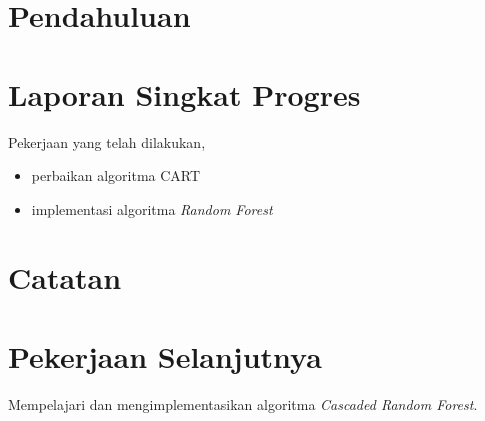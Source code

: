 






\section{Pendahuluan}



\section{Laporan Singkat Progres}

Pekerjaan yang telah dilakukan,
\begin{itemize}
\item perbaikan algoritma CART
\item implementasi algoritma \textit{Random Forest}
\end{itemize}

\section{Catatan}



\section{Pekerjaan Selanjutnya}

Mempelajari dan mengimplementasikan algoritma \textit{Cascaded Random Forest}.

\clearpage
{}

\advisorsignature

\clearpage
{}
\printbibliography

\newpage
\appendix



